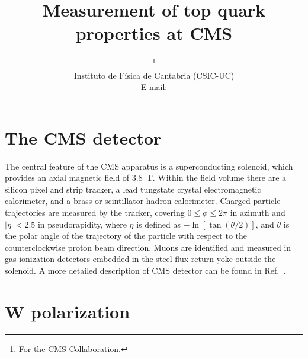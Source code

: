 \documentclass[a4paper]{PoS}
\title{Measurement of top quark properties at CMS}
\author{\speaker{J\'onatan Piedra}\thanks{For the CMS Collaboration.}\\
        Instituto de F\'isica de Cantabria (CSIC-UC)\\
        E-mail: \email{piedra@cern.ch}}
\begin{document}
\section{The CMS detector}

The central feature of the CMS apparatus is a superconducting solenoid, which
provides an axial magnetic field of 3.8~T. Within the field volume there are a
silicon pixel and strip tracker, a lead tungstate crystal electromagnetic
calorimeter, and a brass or scintillator hadron calorimeter. Charged-particle
trajectories are measured by the tracker, covering $0 \leq \phi \leq 2\pi$ in
azimuth and $|\eta| < 2.5$ in pseudorapidity, where $\eta$ is defined as
$-\ln\left[\tan(\theta/2)\right]$, and $\theta$ is the polar angle of
the trajectory of the particle with respect to the counterclockwise proton beam
direction. Muons are identified and measured in gas-ionization detectors embedded
in the steel flux return yoke outside the solenoid. A more detailed description
of CMS detector can be found in Ref.~\cite{cms}.


\section{W polarization}
\end{document}
